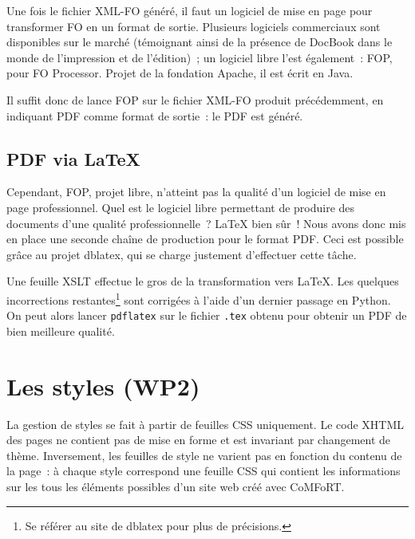 \documentclass[final,11pt,a4paper,twoside,titlepage]{article}
\newcommand{\p}{\vspace{0.3em}}
\newcommand{\code}[1]{\texttt{#1}}
\begin{document}
{      Une fois le fichier XML-FO généré, il faut un logiciel de mise en page
      pour transformer FO en un format de sortie. Plusieurs logiciels
      commerciaux sont disponibles sur le marché (témoignant ainsi de la
      présence de DocBook dans le monde de l'impression et de l'édition)~; un
      logiciel libre l'est également~: FOP, pour FO Processor. Projet de la
      fondation Apache, il est écrit en Java. \p

      Il suffit donc de lance FOP sur le fichier XML-FO produit précédemment, en
      indiquant PDF comme format de sortie~: le PDF est généré.

    \subsection{PDF via \LaTeX}
      Cependant, FOP, projet libre, n'atteint pas la qualité d'un logiciel de
      mise en page professionnel. Quel est le logiciel libre permettant de
      produire des documents d'une qualité professionnelle~? \LaTeX{} bien sûr~!
      Nous avons donc mis en place une seconde chaîne de production pour le
      format PDF. Ceci est possible grâce au projet dblatex, qui se charge
      justement d'effectuer cette tâche. \p

      Une feuille XSLT effectue le gros de la transformation vers \LaTeX{}. Les
      quelques incorrections restantes\footnote{Se référer au site de dblatex
      pour plus de précisions.} sont corrigées à l'aide d'un dernier passage en
      Python. On peut alors lancer \code{pdflatex} sur le fichier \code{.tex}
      obtenu pour obtenir un PDF de bien meilleure qualité.

  \section{Les styles (WP2)}
    La gestion de styles se fait à partir de feuilles CSS uniquement. Le code
    XHTML des pages ne contient pas de mise en forme et est invariant par
    changement de thème. Inversement, les feuilles de style ne varient pas en
    fonction du contenu de la page~: à chaque style correspond une feuille CSS
    qui contient les informations sur les tous les éléments possibles d'un
    site web créé avec CoMFoRT.

}
\end{document}
